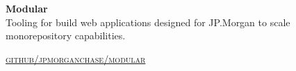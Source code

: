 
{\raggedright
  \textbf{Modular}
  \\

  Tooling for build web applications designed for JP.Morgan to scale monorepository capabilities.

  \textsc{\small\href{http://github.com/jpmorganchase/modular}{github/jpmorganchase/modular}}
} \\

